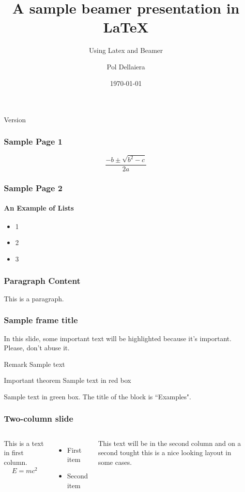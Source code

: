 \documentclass{beamer}
\title{A sample beamer presentation in \LaTeX}
\subtitle{Using Latex and Beamer}
\author{Pol Dellaiera}
\institute{Institute name here}
\date{\today}
\begin{document}
\begin{frame}
	\titlepage
	Version {\gitrevisionlong}
\end{frame}

\begin{frame}
    \frametitle{Sample Page 1}
    \[\frac{-b \pm \sqrt{b^2 - c}}{2a}\]
\end{frame}

\begin{frame}
	\frametitle{Sample Page 2}
	\framesubtitle{An Example of Lists}
	\begin{itemize}
		\item 1
		\item 2
		\item 3
	\end{itemize}
\end{frame}

\begin{frame}
    \frametitle{Paragraph Content}
    This is a paragraph.
\end{frame}

\begin{frame}
	\frametitle{Sample frame title}

	In this slide, some important text will be
	\alert{highlighted} because it's important.
	Please, don't abuse it.

	\begin{block}{Remark}
	Sample text
	\end{block}

	\begin{alertblock}{Important theorem}
	Sample text in red box
	\end{alertblock}

	\begin{examples}
	Sample text in green box. The title of the block is ``Examples".
	\end{examples}
\end{frame}

\begin{frame}
	\frametitle{Two-column slide}

	\begin{columns}
			This is a text in first column.
			$$E=mc^2$$
			\begin{itemize}
				\item First item
				\item Second item
			\end{itemize}

			This text will be in the second column
			and on a second tought this is a nice looking
			layout in some cases.
	\end{columns}
\end{frame}
\end{document}
